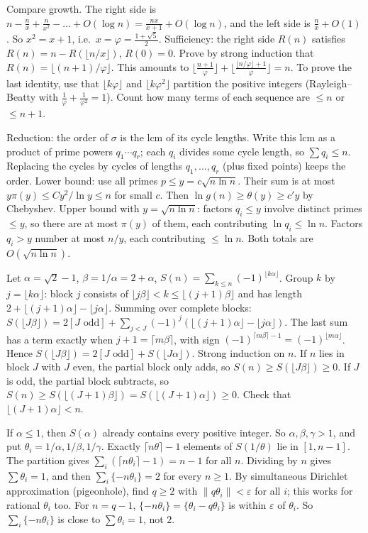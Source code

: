 \documentclass[11pt,a4paper]{article}
\begin{document}
 Compare growth. The right side is $n-\frac nx+\frac n{x^2}-\dots+O(\log n)=\frac{nx}{x+1}+O(\log n)$, and the left side is $\frac nx+O(1)$. So $x^2=x+1$, i.e.\ $x=\varphi=\frac{1+\sqrt5}2$.
 Sufficiency: the right side $R(n)$ satisfies $R(n)=n-R(\lfloor n/x\rfloor)$, $R(0)=0$. Prove by strong induction that $R(n)=\lfloor(n+1)/\varphi\rfloor$. This amounts to $\lfloor\frac{n+1}\varphi\rfloor+\lfloor\frac{\lfloor n/\varphi\rfloor+1}\varphi\rfloor=n$.
 To prove the last identity, use that $\lfloor k\varphi\rfloor$ and $\lfloor k\varphi^2\rfloor$ partition the positive integers (Rayleigh--Beatty with $\frac1\varphi+\frac1{\varphi^2}=1$). Count how many terms of each sequence are $\le n$ or $\le n+1$.

 Reduction: the order of $\sigma$ is the lcm of its cycle lengths. Write this lcm as a product of prime powers $q_1\cdots q_r$; each $q_i$ divides some cycle length, so $\sum q_i\le n$. Replacing the cycles by cycles of lengths $q_1,\dots,q_r$ (plus fixed points) keeps the order.
 Lower bound: use all primes $p\le y=c\sqrt{n\ln n}$. Their sum is at most $y\pi(y)\le Cy^2/\ln y\le n$ for small $c$. Then $\ln g(n)\ge\theta(y)\ge c'y$ by Chebyshev.
 Upper bound with $y=\sqrt{n\ln n}$: factors $q_i\le y$ involve distinct primes $\le y$, so there are at most $\pi(y)$ of them, each contributing $\ln q_i\le\ln n$. Factors $q_i>y$ number at most $n/y$, each contributing $\le\ln n$. Both totals are $O(\sqrt{n\ln n})$.

 Let $\alpha=\sqrt2-1$, $\beta=1/\alpha=2+\alpha$, $S(n)=\sum_{k\le n}(-1)^{\lfloor k\alpha\rfloor}$. Group $k$ by $j=\lfloor k\alpha\rfloor$: block $j$ consists of $\lfloor j\beta\rfloor<k\le\lfloor(j+1)\beta\rfloor$ and has length $2+\lfloor(j+1)\alpha\rfloor-\lfloor j\alpha\rfloor$.
 Summing over complete blocks: $S(\lfloor J\beta\rfloor)=2[J\text{ odd}]+\sum_{j<J}(-1)^j(\lfloor(j+1)\alpha\rfloor-\lfloor j\alpha\rfloor)$. The last sum has a term exactly when $j+1=\lceil m\beta\rceil$, with sign $(-1)^{\lceil m\beta\rceil-1}=(-1)^{\lfloor m\alpha\rfloor}$. Hence $S(\lfloor J\beta\rfloor)=2[J\text{ odd}]+S(\lfloor J\alpha\rfloor)$.
 Strong induction on $n$. If $n$ lies in block $J$ with $J$ even, the partial block only adds, so $S(n)\ge S(\lfloor J\beta\rfloor)\ge0$. If $J$ is odd, the partial block subtracts, so $S(n)\ge S(\lfloor(J+1)\beta\rfloor)=S(\lfloor(J+1)\alpha\rfloor)\ge0$. Check that $\lfloor(J+1)\alpha\rfloor<n$.

 If $\alpha\le1$, then $S(\alpha)$ already contains every positive integer. So $\alpha,\beta,\gamma>1$, and put $\theta_i=1/\alpha,1/\beta,1/\gamma$. Exactly $\lceil n\theta\rceil-1$ elements of $S(1/\theta)$ lie in $[1,n-1]$.
 The partition gives $\sum_i(\lceil n\theta_i\rceil-1)=n-1$ for all $n$. Dividing by $n$ gives $\sum\theta_i=1$, and then $\sum_i\{-n\theta_i\}=2$ for every $n\ge1$.
 By simultaneous Dirichlet approximation (pigeonhole), find $q\ge2$ with $\|q\theta_i\|<\varepsilon$ for all $i$; this works for rational $\theta_i$ too. For $n=q-1$, $\{-n\theta_i\}=\{\theta_i-q\theta_i\}$ is within $\varepsilon$ of $\theta_i$. So $\sum_i\{-n\theta_i\}$ is close to $\sum\theta_i=1$, not $2$.
\end{document}
